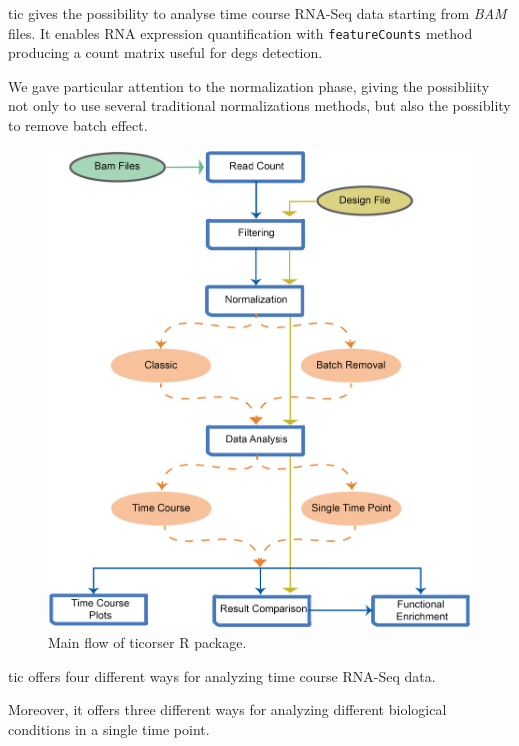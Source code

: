 \gls{tic} gives the possibility to analyse time course RNA-Seq data starting from \textit{BAM} files.
It enables RNA expression quantification with \lstinline!featureCounts! method producing a count matrix useful for \glspl{deg} detection.

We gave particular attention to the normalization phase, giving the possibliity not only to use several traditional normalizations methods, but also the possiblity to remove batch effect.


\begin{figure}[H]
\includegraphics[width=\textwidth,height=\textheight,keepaspectratio]{img/ticorser/main_flow.pdf}
\caption[ticorser mainflow]{Main flow of ticorser R package.}
\label{fig:ticorserflow}
\centering
\end{figure}

\gls{tic} offers four different ways for analyzing time course RNA-Seq data.

Moreover, it offers three different ways for analyzing different biological conditions in a single time point.